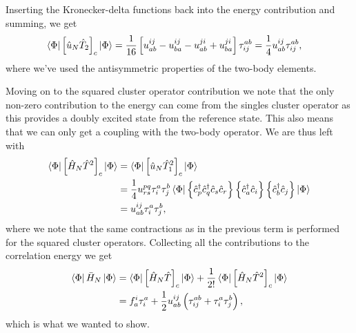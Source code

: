         Inserting the Kronecker-delta functions back into the energy
        contribution and summing, we get
        \begin{align}
            \bra{\Phi}\left[ 
                \hat{u}_N \hat{T}_2
             \right]_c
            \ket{\Phi}
            &=
            \frac{1}{16}\left[ 
                u^{ij}_{ab}
                - u^{ij}_{ba}
                - u^{ji}_{ab}
                + u^{ji}_{ba}
             \right]\tau^{ab}_{ij}
            =
            \frac{1}{4}u^{ij}_{ab}\tau^{ab}_{ij},
        \end{align}
        where we've used the antisymmetric properties of the two-body
        elements.

        Moving on to the squared cluster operator contribution we note that the
        only non-zero contribution to the energy can come from the singles
        cluster operator as this provides a doubly excited state from the
        reference state.
        This also means that we can only get a coupling with the two-body
        operator.
        We are thus left with
        \begin{align}
            \bra{\Phi}\left[ 
                \hat{H}_N \hat{T}^2
             \right]_c
            \ket{\Phi}
            &=
            \bra{\Phi}\left[ 
                \hat{u}_N \hat{T}_1^2
             \right]_c
            \ket{\Phi}
            \\
            &=
            \frac{1}{4}u^{pq}_{rs}\tau^{a}_{i}\tau^{b}_{j}
            \bra{\Phi}
            \left\{ 
                \hat{c}_{p}^{\dagger}
                \hat{c}_{q}^{\dagger}
                \hat{c}_{s}
                \hat{c}_{r}
             \right\}
            \left\{ 
                \hat{c}_{a}^{\dagger}
                \hat{c}_{i}
             \right\}
            \left\{ 
                \hat{c}_{b}^{\dagger}
                \hat{c}_{j}
             \right\}
            \ket{\Phi}
            \\
            &=
            u^{ij}_{ab}\tau^{a}_{i}\tau^{b}_{j},
        \end{align}
        where we note that the same contractions as in the previous term is
        performed for the squared cluster operators.
        Collecting all the contributions to the correlation energy we get
        \begin{align}
            \bra{\Phi}\bar{H}_N\ket{\Phi}
            &=
            \bra{\Phi}\left[ 
                \hat{H}_N\hat{T}
             \right]_{c}\ket{\Phi}
            + \frac{1}{2!}
            \bra{\Phi}\left[ 
                \hat{H}_N\hat{T}^2
             \right]_{c}\ket{\Phi}
            \\
            &=
            f^{i}_{a}\tau^{a}_{i}
            + \frac{1}{2} u^{ij}_{ab}\left( 
                \tau^{ab}_{ij}
                + \tau^{a}_{i}\tau^{b}_{j}
             \right),
        \end{align}
        which is what we wanted to show.


